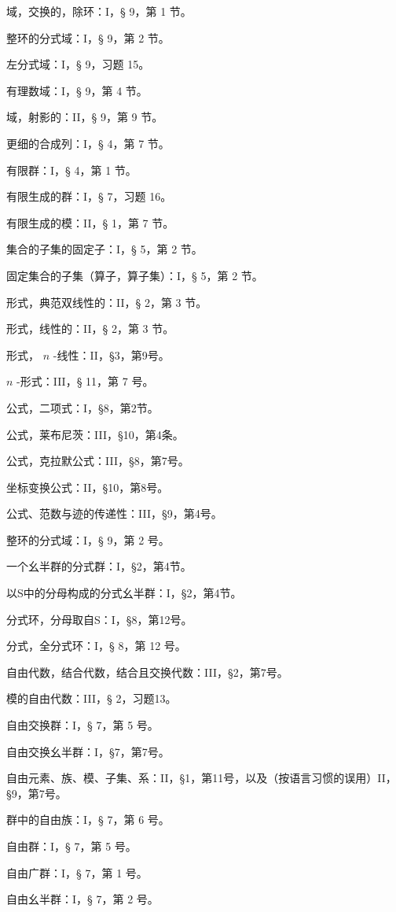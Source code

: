 域，交换的，除环：I，§ 9，第 1 节。

整环的分式域：I，§ 9，第 2 节。

左分式域：I，§ 9，习题 15。

有理数域：I，§ 9，第 4 节。

域，射影的：II，§ 9，第 9 节。

更细的合成列：I，§ 4，第 7 节。

有限群：I，§ 4，第 1 节。

有限生成的群：I，§ 7，习题 16。

有限生成的模：II，§ 1，第 7 节。

集合的子集的固定子：I，§ 5，第 2 节。

固定集合的子集（算子，算子集）：I，§ 5，第 2 节。

形式，典范双线性的：II，§ 2，第 3 节。

形式，线性的：II，§ 2，第 3 节。

形式， \(n\) -线性：II，§3，第9号。

\(n\) -形式：III，§ 11，第 7 号。

公式，二项式：I，§8，第2节。

公式，莱布尼茨：III，§10，第4条。

公式，克拉默公式：III，§8，第7号。

坐标变换公式：II，§10，第8号。

公式、范数与迹的传递性：III，§9，第4号。

整环的分式域：I，§ 9，第 2 号。

一个幺半群的分式群：I，§2，第4节。

以S中的分母构成的分式幺半群：I，§2，第4节。

分式环，分母取自S：I，§8，第12号。

分式，全分式环：I，§ 8，第 12 号。

自由代数，结合代数，结合且交换代数：III，§2，第7号。

模的自由代数：III，§ 2，习题13。

自由交换群：I，§ 7，第 5 号。

自由交换幺半群：I，§7，第7号。

自由元素、族、模、子集、系：II，§1，第11号，以及（按语言习惯的误用）II，§9，第7号。

群中的自由族：I，§ 7，第 6 号。

自由群：I，§ 7，第 5 号。

自由广群：I，§ 7，第 1 号。

自由幺半群：I，§ 7，第 2 号。

